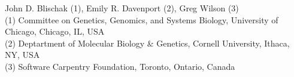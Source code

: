 John D. Blischak (1), Emily R. Davenport (2), Greg Wilson (3)\\
(1) Committee on Genetics, Genomics, and Systems Biology, University of Chicago, Chicago, IL, USA\\
(2) Deptartment of Molecular Biology & Genetics, Cornell University, Ithaca, NY, USA\\
(3) Software Carpentry Foundation, Toronto, Ontario, Canada
